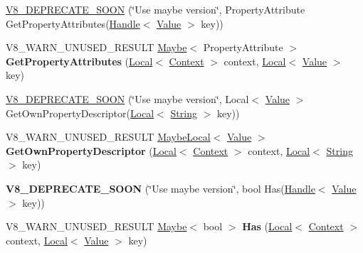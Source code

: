 \begin{DoxyCompactItemize}
\item 
\hyperlink{classv8_1_1_object_ac03d861d29fb9de453d0779a80ac29ad}{V8\+\_\+\+D\+E\+P\+R\+E\+C\+A\+T\+E\+\_\+\+S\+O\+O\+N} (\char`\"{}Use maybe version\char`\"{}, Property\+Attribute Get\+Property\+Attributes(\hyperlink{classv8_1_1_local}{Handle}$<$ \hyperlink{classv8_1_1_value}{Value} $>$ key))
\item 
\hypertarget{classv8_1_1_object_ae5c97a596bcb634c50605a574358a9c6}{}V8\+\_\+\+W\+A\+R\+N\+\_\+\+U\+N\+U\+S\+E\+D\+\_\+\+R\+E\+S\+U\+L\+T \hyperlink{classv8_1_1_maybe}{Maybe}$<$ Property\+Attribute $>$ {\bfseries Get\+Property\+Attributes} (\hyperlink{classv8_1_1_local}{Local}$<$ \hyperlink{classv8_1_1_context}{Context} $>$ context, \hyperlink{classv8_1_1_local}{Local}$<$ \hyperlink{classv8_1_1_value}{Value} $>$ key)\label{classv8_1_1_object_ae5c97a596bcb634c50605a574358a9c6}

\item 
\hyperlink{classv8_1_1_object_ac5503b0a8e861ec721c680eccf5aec2d}{V8\+\_\+\+D\+E\+P\+R\+E\+C\+A\+T\+E\+\_\+\+S\+O\+O\+N} (\char`\"{}Use maybe version\char`\"{}, Local$<$ \hyperlink{classv8_1_1_value}{Value} $>$ Get\+Own\+Property\+Descriptor(\hyperlink{classv8_1_1_local}{Local}$<$ \hyperlink{classv8_1_1_string}{String} $>$ key))
\item 
\hypertarget{classv8_1_1_object_a17fd31922f11c634183c59c0eb08cf65}{}V8\+\_\+\+W\+A\+R\+N\+\_\+\+U\+N\+U\+S\+E\+D\+\_\+\+R\+E\+S\+U\+L\+T \hyperlink{classv8_1_1_maybe_local}{Maybe\+Local}$<$ \hyperlink{classv8_1_1_value}{Value} $>$ {\bfseries Get\+Own\+Property\+Descriptor} (\hyperlink{classv8_1_1_local}{Local}$<$ \hyperlink{classv8_1_1_context}{Context} $>$ context, \hyperlink{classv8_1_1_local}{Local}$<$ \hyperlink{classv8_1_1_string}{String} $>$ key)\label{classv8_1_1_object_a17fd31922f11c634183c59c0eb08cf65}

\item 
\hypertarget{classv8_1_1_object_a018dc28e947979eee660f927c7fdb965}{}{\bfseries V8\+\_\+\+D\+E\+P\+R\+E\+C\+A\+T\+E\+\_\+\+S\+O\+O\+N} (\char`\"{}Use maybe version\char`\"{}, bool Has(\hyperlink{classv8_1_1_local}{Handle}$<$ \hyperlink{classv8_1_1_value}{Value} $>$ key))\label{classv8_1_1_object_a018dc28e947979eee660f927c7fdb965}

\item 
\hypertarget{classv8_1_1_object_a57d4819c2cc13715ed22dd23cdc84d7c}{}V8\+\_\+\+W\+A\+R\+N\+\_\+\+U\+N\+U\+S\+E\+D\+\_\+\+R\+E\+S\+U\+L\+T \hyperlink{classv8_1_1_maybe}{Maybe}$<$ bool $>$ {\bfseries Has} (\hyperlink{classv8_1_1_local}{Local}$<$ \hyperlink{classv8_1_1_context}{Context} $>$ context, \hyperlink{classv8_1_1_local}{Local}$<$ \hyperlink{classv8_1_1_value}{Value} $>$ key)\label{classv8_1_1_object_a57d4819c2cc13715ed22dd23cdc84d7c}


\end{DoxyCompactItemize}
